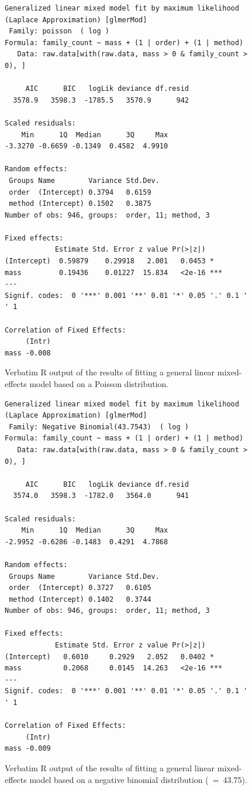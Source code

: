 \documentclass[10pt,letterpaper,twocolumn]{article}
\begin{document}
\begin{figure}[h]
	\lstset{numbers=left}
	\lstset{xleftmargin=5mm,framexleftmargin=5mm}
	\begin{lstlisting}
Generalized linear mixed model fit by maximum likelihood (Laplace Approximation) [glmerMod]
 Family: poisson  ( log )
Formula: family_count ~ mass + (1 | order) + (1 | method)
   Data: raw.data[with(raw.data, mass > 0 & family_count > 0), ]

     AIC      BIC   logLik deviance df.resid 
  3578.9   3598.3  -1785.5   3570.9      942 

Scaled residuals: 
    Min      1Q  Median      3Q     Max 
-3.3270 -0.6659 -0.1349  0.4582  4.9910 

Random effects:
 Groups Name        Variance Std.Dev.
 order  (Intercept) 0.3794   0.6159  
 method (Intercept) 0.1502   0.3875  
Number of obs: 946, groups:  order, 11; method, 3

Fixed effects:
            Estimate Std. Error z value Pr(>|z|)    
(Intercept)  0.59879    0.29918   2.001   0.0453 *  
mass         0.19436    0.01227  15.834   <2e-16 ***
---
Signif. codes:  0 '***' 0.001 '**' 0.01 '*' 0.05 '.' 0.1 ' ' 1

Correlation of Fixed Effects:
     (Intr)
mass -0.008
	\end{lstlisting}
	\caption{Verbatim R output of the results of fitting a general linear mixed-effects model based on a Poisson distribution.}
	\label{fig:glmm_poisson}
	\smallskip
	\nointerlineskip
	\hrulefill
\end{figure}

\begin{figure}[h]
	\lstset{numbers=left}
	\lstset{xleftmargin=5mm,framexleftmargin=5mm}
	\begin{lstlisting}
Generalized linear mixed model fit by maximum likelihood (Laplace Approximation) [glmerMod]
 Family: Negative Binomial(43.7543)  ( log )
Formula: family_count ~ mass + (1 | order) + (1 | method)
   Data: raw.data[with(raw.data, mass > 0 & family_count > 0), ]

     AIC      BIC   logLik deviance df.resid 
  3574.0   3598.3  -1782.0   3564.0      941 

Scaled residuals: 
    Min      1Q  Median      3Q     Max 
-2.9952 -0.6286 -0.1483  0.4291  4.7868 

Random effects:
 Groups Name        Variance Std.Dev.
 order  (Intercept) 0.3727   0.6105  
 method (Intercept) 0.1402   0.3744  
Number of obs: 946, groups:  order, 11; method, 3

Fixed effects:
            Estimate Std. Error z value Pr(>|z|)    
(Intercept)   0.6010     0.2929   2.052   0.0402 *  
mass          0.2068     0.0145  14.263   <2e-16 ***
---
Signif. codes:  0 '***' 0.001 '**' 0.01 '*' 0.05 '.' 0.1 ' ' 1

Correlation of Fixed Effects:
     (Intr)
mass -0.009
	\end{lstlisting}
	\caption{Verbatim R output of the results of fitting a general linear mixed-effects model based on a negative binomial distribution (\texttheta~=~43.75).}
	\label{fig:glmm_nb}
	\smallskip
	\nointerlineskip
	\hrulefill
\end{figure}
\end{document}
